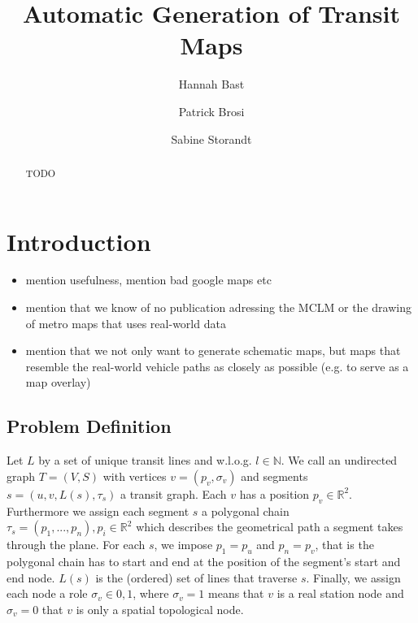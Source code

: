 \documentclass{llncs}
\begin{document}
%
\mainmatter              %
%
\title{Automatic Generation of Transit Maps}
%
%
\author{Hannah Bast \and Patrick Brosi \and
Sabine Storandt}
%
%
%

\maketitle              %

\begin{abstract}
TODO
\end{abstract}
%
\section{Introduction}
%

\begin{itemize}
\item mention usefulness, mention bad google maps etc
\item mention that we know of no publication adressing the MCLM or the drawing of metro maps that uses real-world data
\item mention that we not only want to generate schematic maps, but maps that resemble the real-world vehicle paths as closely as possible (e.g. to serve as a map overlay)
\end{itemize}

\subsection{Problem Definition}

Let $L$ by a set of unique transit lines and w.l.o.g. $l \in \mathbb{N}$. We call an undirected graph $T = (V, S)$ with vertices $v = (p_v, \sigma_v)$ and segments $s = (u, v, L(s), \tau_s)$ a transit graph. Each $v$ has a position $p_v \in \mathbb{R}^2$. Furthermore we assign each segment $s$ a polygonal chain $\tau_s = (p_1, ..., p_n), p_i \in \mathbb{R}^2$ which describes the geometrical path a segment takes through the plane. For each $s$, we impose $p_1 = p_u$ and $p_n = p_v$, that is the polygonal chain has to start and end at the position of the segment's start and end node. $L(s)$ is the (ordered) set of lines that traverse $s$. Finally, we assign each node a role $\sigma_v \in {0, 1}$, where $\sigma_v = 1$ means that $v$ is a real station node and $\sigma_v = 0$ that $v$ is only a spatial topological node.
\end{document}
